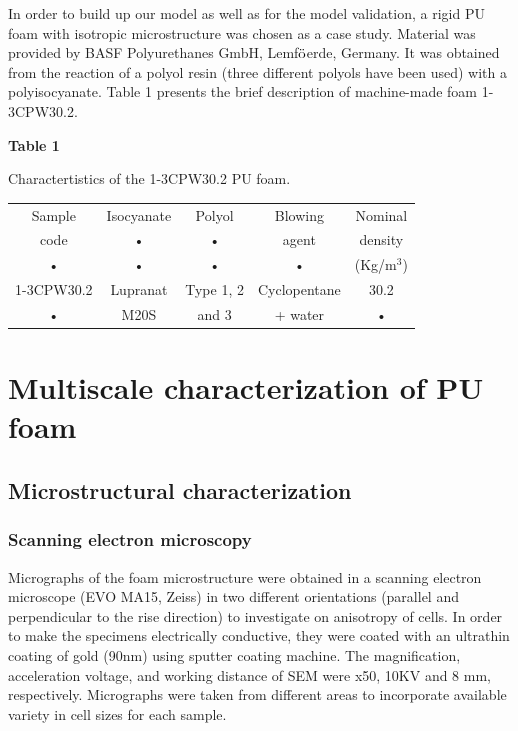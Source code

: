 \documentclass[review]{elsarticle}
\begin{document}
In order to build up our model as well as for the model validation, a rigid PU foam with isotropic microstructure was chosen as a case study.  Material was provided by BASF Polyurethanes GmbH, Lemf$\ddot{\textnormal{o}}$erde, Germany. It was obtained from the reaction of a polyol resin (three different polyols have been used) with a polyisocyanate. Table 1 presents the brief description of machine-made foam 1-3CPW30.2.

\textbf{Table 1}

Charactertistics of the 1-3CPW30.2 PU foam.

\begin{tabular}{ccccc}
\hline 
\rule[-1ex]{0pt}{2.5ex} Sample & Isocyanate & Polyol & Blowing & Nominal \\ 

\rule[-1ex]{0pt}{2.5ex} code & • & • & agent & density \\ 

\rule[-1ex]{0pt}{2.5ex} • & • & • & • & (Kg/m$^3$) \\ 
\hline 
\rule[-1ex]{0pt}{2.5ex} 1-3CPW30.2 & Lupranat & Type 1, 2 & Cyclopentane & 30.2 \\ 

\rule[-1ex]{0pt}{2.5ex} • & M20S & and 3 & + water & • \\ 
\hline 
\end{tabular} 

\section{Multiscale characterization of PU foam}

\subsection{Microstructural characterization}

\subsubsection{Scanning electron microscopy}

Micrographs of the foam microstructure were obtained in a scanning electron microscope (EVO MA15, Zeiss) in two different orientations (parallel and perpendicular to the rise direction) to investigate on anisotropy of cells. In order to make the specimens electrically conductive, they were coated with an ultrathin coating of gold (90nm) using sputter coating machine.  The magnification, acceleration voltage, and working distance of SEM were x50, 10KV and 8 mm, respectively. Micrographs were taken from different areas to incorporate available variety in cell sizes for each sample.
\end{document}
